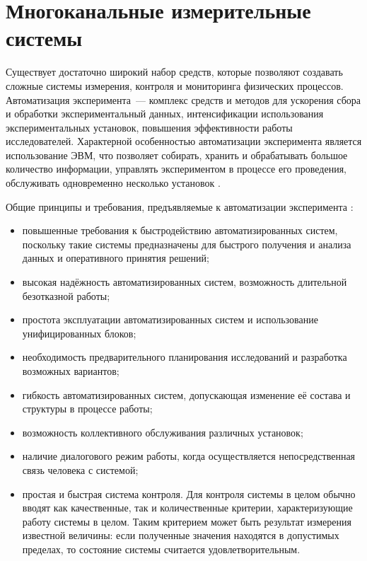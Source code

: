 \documentclass[a4paper, 14pt, titlepage]{extarticle}
\begin{document}
  \section{Многоканальные измерительные системы}

  Существует достаточно широкий набор средств, которые позволяют создавать сложные системы
  измерения, контроля и мониторинга физических процессов. Автоматизация эксперимента~--- комплекс
  средств и методов для ускорения сбора и обработки экспериментальный данных, интенсификации
  использования экспериментальных установок, повышения эффективности работы исследователей.
  Характерной особенностью автоматизации эксперимента  является использование ЭВМ, что позволяет
  собирать, хранить и обрабатывать большое количество информации, управлять экспериментом в процессе
  его проведения, обслуживать одновременно несколько установок \cite{sokolov-auto-measure}.

  Общие принципы и требования, предъявляемые к автоматизации эксперимента \cite{vinogradov-discrete, kurochkin-kamak}:
  \begin{itemize}
    \item повышенные требования к быстродействию автоматизированных систем, поскольку такие системы
      предназначены для быстрого получения и анализа данных и оперативного принятия решений;
    \item высокая надёжность автоматизированных систем, возможность длительной безотказной работы;
    \item простота эксплуатации автоматизированных систем и использование унифицированных блоков;
    \item необходимость предварительного планирования исследований и разработка возможных вариантов;
    \item гибкость автоматизированных систем, допускающая изменение её состава и структуры в процессе работы;
    \item возможность коллективного обслуживания различных установок;
    \item наличие диалогового режим работы, когда осуществляется непосредственная связь человека с системой;
    \item простая и быстрая система контроля. Для контроля системы в целом обычно вводят как
      качественные, так и количественные критерии, характеризующие работу системы в целом. Таким
      критерием может быть результат измерения известной величины: если полученные значения находятся
      в допустимых пределах, то состояние системы считается удовлетворительным.
  \end{itemize}
\end{document}
